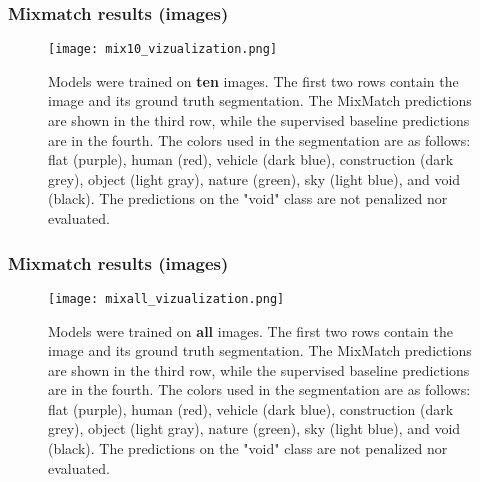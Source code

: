 \documentclass[11pt]{beamer}
\begin{document}
\begin{frame}
    \frametitle{Mixmatch results (images)}
    \begin{figure}[t]
        \centering
        \texttt{[image: mix10\_vizualization.png]}
        \caption{Models were trained on \textbf{ten} images. The first two rows contain the image and its ground truth segmentation. The MixMatch predictions are shown in the third row, 
        while the supervised baseline predictions are in the fourth.\newline
        The colors used in the segmentation are as follows: flat (purple), human (red), vehicle (dark blue), construction (dark grey), 
        object (light gray), nature (green), sky (light blue), and void (black). The predictions on the "void" class are not penalized nor evaluated.}
    \end{figure}
\end{frame}
\begin{frame}
    \frametitle{Mixmatch results (images)}
    \begin{figure}[t]
        \centering
        \texttt{[image: mixall\_vizualization.png]}
        \caption{Models were trained on \textbf{all} images. The first two rows contain the image and its ground truth segmentation. The MixMatch predictions are shown in the third row, 
        while the supervised baseline predictions are in the fourth.\newline
        The colors used in the segmentation are as follows: flat (purple), human (red), vehicle (dark blue), construction (dark grey), 
        object (light gray), nature (green), sky (light blue), and void (black). The predictions on the "void" class are not penalized nor evaluated.}
    \end{figure}
\end{frame}
\end{document}
